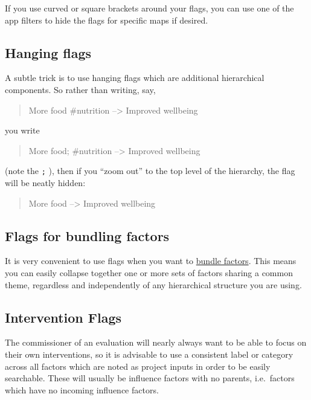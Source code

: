 \documentclass[
]{book}
\begin{document}
If you use curved or square brackets around your flags, you can use one of the app filters to hide the flags for specific maps if desired.

\hypertarget{xhanging-flags}{%
\subsection{Hanging flags}\label{xhanging-flags}}

A subtle trick is to use hanging flags which are additional hierarchical components. So rather than writing, say,

\begin{quote}
More food \#nutrition --\textgreater{} Improved wellbeing
\end{quote}

you write

\begin{quote}
More food; \#nutrition --\textgreater{} Improved wellbeing
\end{quote}

(note the \texttt{;} ), then if you ``zoom out'' to the top level of the hierarchy, the flag will be neatly hidden:

\begin{quote}
More food --\textgreater{} Improved wellbeing
\end{quote}

\hypertarget{flags-for-bundling-factors}{%
\subsection{Flags for bundling factors}\label{flags-for-bundling-factors}}

It is very convenient to use flags when you want to \protect\hyperlink{bundlefactors}{bundle factors}. This means you can easily collapse together one or more sets of factors sharing a common theme, regardless and independently of any hierarchical structure you are using.

\hypertarget{intervention-flags}{%
\subsection{Intervention Flags}\label{intervention-flags}}

The commissioner of an evaluation will nearly always want to be able to focus on their own interventions, so it is advisable to use a consistent label or category across all factors which are noted as project inputs in order to be easily searchable. These will usually be influence factors with no parents, i.e.~factors which have no incoming influence factors.
\end{document}
